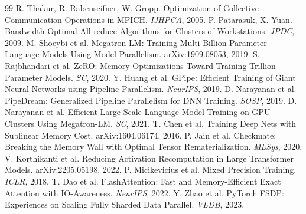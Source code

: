 \documentclass[11pt,a4paper]{ctexart}
\begin{document}
\begin{thebibliography}{99}
 R. Thakur, R. Rabenseifner, W. Gropp. Optimization of Collective Communication Operations in MPICH. \emph{IJHPCA}, 2005.
 P. Patarasuk, X. Yuan. Bandwidth Optimal All-reduce Algorithms for Clusters of Workstations. \emph{JPDC}, 2009.
 M. Shoeybi et al. Megatron-LM: Training Multi-Billion Parameter Language Models Using Model Parallelism. arXiv:1909.08053, 2019.
 S. Rajbhandari et al. ZeRO: Memory Optimizations Toward Training Trillion Parameter Models. \emph{SC}, 2020.
 Y. Huang et al. GPipe: Efficient Training of Giant Neural Networks using Pipeline Parallelism. \emph{NeurIPS}, 2019.
 D. Narayanan et al. PipeDream: Generalized Pipeline Parallelism for DNN Training. \emph{SOSP}, 2019.
 D. Narayanan et al. Efficient Large-Scale Language Model Training on GPU Clusters Using Megatron-LM. \emph{SC}, 2021.
 T. Chen et al. Training Deep Nets with Sublinear Memory Cost. arXiv:1604.06174, 2016.
 P. Jain et al. Checkmate: Breaking the Memory Wall with Optimal Tensor Rematerialization. \emph{MLSys}, 2020.
 V. Korthikanti et al. Reducing Activation Recomputation in Large Transformer Models. arXiv:2205.05198, 2022.
 P. Micikevicius et al. Mixed Precision Training. \emph{ICLR}, 2018.
 T. Dao et al. FlashAttention: Fast and Memory-Efficient Exact Attention with IO-Awareness. \emph{NeurIPS}, 2022.
 Y. Zhao et al. PyTorch FSDP: Experiences on Scaling Fully Sharded Data Parallel. \emph{VLDB}, 2023.
\end{thebibliography}
\end{document}
